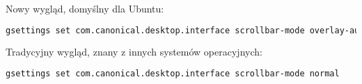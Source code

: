 Nowy wygląd, domyślny dla Ubuntu:

\begin{lstlisting}[language=bash]
gsettings set com.canonical.desktop.interface scrollbar-mode overlay-auto
\end{lstlisting}

Tradycyjny wygląd, znany z innych systemów operacyjnych:

\begin{lstlisting}[language=bash]
gsettings set com.canonical.desktop.interface scrollbar-mode normal
\end{lstlisting}
